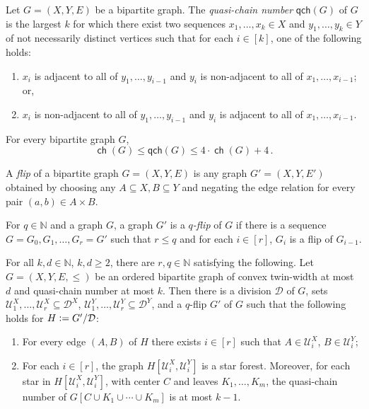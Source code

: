 \documentclass{theoretics}
\newcommand{\define}{\vcentcolon=}
\newcommand{\cD}{\ensuremath{\mathcal{D}}}
\newcommand{\cU}{\ensuremath{\mathcal{U}}}
\newcommand{\bN}{\ensuremath{\mathbb{N}}}
\DeclareMathOperator\ch{\mathsf{ch}}
\begin{document}
\newcommand{\qch}{\mathsf{qch}}
\begin{definition}
Let $G = (X,Y,E)$ be a bipartite graph. The \emph{quasi-chain number} $\qch(G)$ of $G$ is the largest $k$ for which
there exist two sequences $x_1, \dotsc, x_k \in X$ and $y_1, \dotsc, y_k \in Y$ of not necessarily distinct vertices such that for each $i\in [k]$, one of the following holds:
\begin{enumerate}
\item $x_i$ is adjacent to all of $y_1, \dotsc, y_{i-1}$ and $y_i$ is non-adjacent to all of $x_1,
\dotsc, x_{i-1}$; or,
\item $x_i$ is non-adjacent to all of $y_1, \dotsc, y_{i-1}$ and $y_i$ is adjacent to all of $x_1,
\dotsc, x_{i-1}$.
\end{enumerate}
\end{definition}

\begin{lemma}
\label{lemma:quasi chain number}
For every bipartite graph $G$,
\[
  \ch(G) \leq \qch(G) \leq 4 \cdot \ch(G) + 4 \,.
\]
\end{lemma}

\begin{definition}[Flip]
A \emph{flip} of a bipartite graph $G = (X,Y,E)$ is any graph $G' = (X,Y,E')$ obtained by choosing
any $A \subseteq X, B \subseteq Y$ and negating the edge relation for every pair $(a,b) \in A \times
B$.

For $q \in \bN$ and a graph $G$, a graph $G'$ is a \emph{$q$-flip} of $G$ if there is a sequence $G
= G_0, G_1, \dotsc, G_r = G'$ such that $r \leq q$ and for each $i \in [r]$, $G_i$ is a flip of
$G_{i-1}$.
\end{definition}

\begin{lemma}
\label{lemma:gpt21 main}
For all $k,d \in \bN$, $k,d \geq 2$, there are $r,q \in \bN$ satisfying the following. Let $G =
(X,Y,E, \leq)$ be an ordered bipartite graph of convex twin-width at most $d$ and quasi-chain number
at most $k$. Then there is a division $\cD$ of $G$, 
sets $\cU^X_1, \dotsc, \cU^X_r \subseteq \cD^X$,
$\cU^Y_1, \dotsc, \cU^Y_r \subseteq \cD^Y$,
and a $q$-flip $G'$ of $G$ such that the following holds for $H \define G' / \cD$:
\begin{enumerate}
\item For every edge $(A,B)$ of $H$ there exists $i \in [r]$ such that $A\in\cU^X_i$, $B \in \cU^Y_i$;
\item For each $i\in[r]$, the graph $H[\cU^X_i,\cU^Y_i]$ is a star forest. 
	Moreover, for each star in $H[\cU^X_i,\cU^Y_i]$,
	with center $C$ and leaves $K_1, \dotsc, K_m$, 
	the quasi-chain number of $G[C \cup K_1 \cup \dotsm \cup K_m]$ is at most $k-1$.
\end{enumerate}
\end{lemma}
\end{document}
